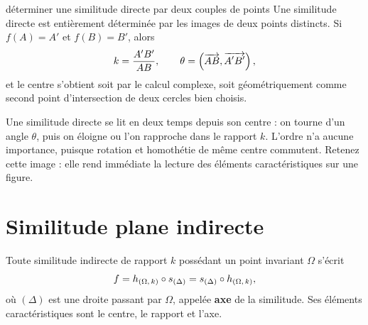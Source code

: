 \begin{methode}{déterminer une similitude directe par deux couples de points}
Une similitude directe est entièrement déterminée par les images de deux
points distincts. Si $f(A) = A'$ et $f(B) = B'$, alors
\[
  k = \frac{A'B'}{AB}, \qquad
  \theta = \left(\overrightarrow{AB},\overrightarrow{A'B'}\right),
\]
et le centre s'obtient soit par le calcul complexe, soit géométriquement comme
second point d'intersection de deux cercles bien choisis.
\end{methode}

\begin{visualisation}
\begin{center}
\end{center}

Une similitude directe se lit en deux temps depuis son centre : on tourne
d'un angle $\theta$, puis on éloigne ou l'on rapproche dans le rapport $k$.
L'ordre n'a aucune importance, puisque rotation et homothétie de même centre
commutent. Retenez cette image : elle rend immédiate la lecture des éléments
caractéristiques sur une figure.
\end{visualisation}

\section{Similitude plane indirecte}

\begin{theoreme}
Toute similitude indirecte de rapport $k$ possédant un point invariant
$\Omega$ s'écrit
\[
  f = h_{(\Omega,\,k)} \circ s_{(\Delta)} = s_{(\Delta)} \circ h_{(\Omega,\,k)},
\]
où $(\Delta)$ est une droite passant par $\Omega$, appelée \textbf{axe} de la
similitude. Ses éléments caractéristiques sont le centre, le rapport et
l'axe.
\end{theoreme}

